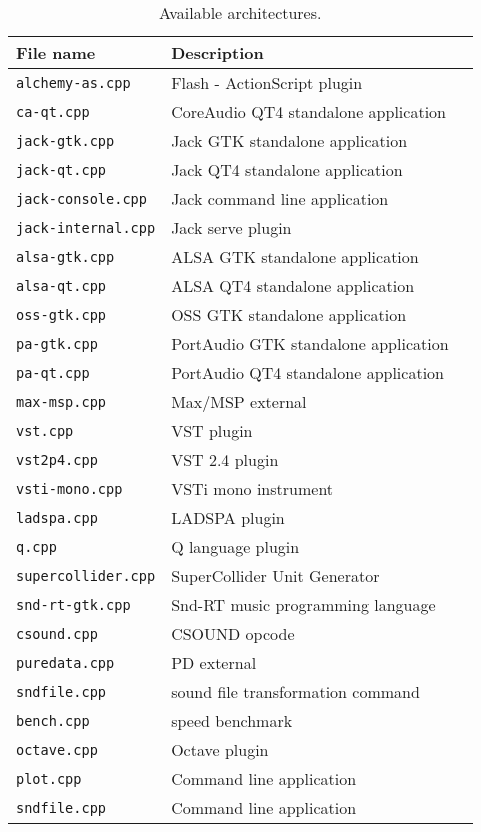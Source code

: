 \begin{table}[htdp]
\begin{center}
\begin{tabular}{|l|l|l|}
\hline
\textbf{File name}			& \textbf{Description}   \\
\hline
\texttt{alchemy-as.cpp} 	& Flash - ActionScript plugin \\
\texttt{ca-qt.cpp} 			& CoreAudio QT4 standalone application  \\
\texttt{jack-gtk.cpp} 		& Jack GTK standalone application  \\
\texttt{jack-qt.cpp} 		& Jack QT4 standalone application  \\
\texttt{jack-console.cpp} 	& Jack command line application  \\
\texttt{jack-internal.cpp} 	& Jack serve plugin  \\
\texttt{alsa-gtk.cpp} 		& ALSA GTK standalone application  \\
\texttt{alsa-qt.cpp} 		& ALSA QT4 standalone application  \\
\texttt{oss-gtk.cpp} 		& OSS GTK standalone application  \\
\texttt{pa-gtk.cpp} 		& PortAudio GTK standalone application  \\
\texttt{pa-qt.cpp} 			& PortAudio QT4 standalone application  \\
\hline
\texttt{max-msp.cpp} 		& Max/MSP external  \\
\texttt{vst.cpp} 			& VST plugin  \\
\texttt{vst2p4.cpp} 		& VST 2.4 plugin  \\
\texttt{vsti-mono.cpp} 		& VSTi mono instrument  \\
\texttt{ladspa.cpp} 		& LADSPA plugin  \\
\texttt{q.cpp} 				& Q language plugin  \\
\texttt{supercollider.cpp} 	& SuperCollider Unit Generator  \\
\texttt{snd-rt-gtk.cpp} 	& Snd-RT music programming language  \\
\texttt{csound.cpp} 		& CSOUND opcode  \\
\texttt{puredata.cpp} 		& PD external  \\
\hline
\texttt{sndfile.cpp} 		& sound file transformation command \\
\texttt{bench.cpp} 			& speed benchmark   \\
\texttt{octave.cpp} 		& Octave plugin   \\
\texttt{plot.cpp} 			& Command line application    \\
\texttt{sndfile.cpp} 		& Command line application    \\
\hline
\end{tabular}
\end{center}
\caption{Available architectures.}
\label{tab:availablearch}
\end{table}%


